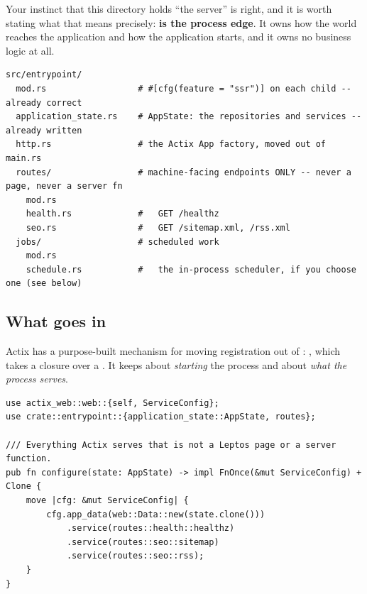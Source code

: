 Your instinct that this directory holds ``the server'' is right, and it is worth stating what that
means precisely: \textbf{ is the process edge}. It owns how the world reaches the
application and how the application starts, and it owns no business logic at all.

\begin{lstlisting}[style=tree,caption={\file{src/entrypoint/} filled in. Everything here is
\code{ssr}-only by nature, which \file{mod.rs} already declares correctly.}]
src/entrypoint/
  mod.rs                  # #[cfg(feature = "ssr")] on each child -- already correct
  application_state.rs    # AppState: the repositories and services -- already written
  http.rs                 # the Actix App factory, moved out of main.rs
  routes/                 # machine-facing endpoints ONLY -- never a page, never a server fn
    mod.rs
    health.rs             #   GET /healthz
    seo.rs                #   GET /sitemap.xml, /rss.xml
  jobs/                   # scheduled work
    mod.rs
    schedule.rs           #   the in-process scheduler, if you choose one (see below)
\end{lstlisting}

\subsection{What goes in }

Actix has a purpose-built mechanism for moving registration out of :
, which takes a closure over a . It keeps 
about \emph{starting} the process and  about \emph{what the process serves}.

\begin{lstlisting}[style=rs,caption={\file{src/entrypoint/http.rs}}]
use actix_web::web::{self, ServiceConfig};
use crate::entrypoint::{application_state::AppState, routes};

/// Everything Actix serves that is not a Leptos page or a server function.
pub fn configure(state: AppState) -> impl FnOnce(&mut ServiceConfig) + Clone {
    move |cfg: &mut ServiceConfig| {
        cfg.app_data(web::Data::new(state.clone()))
            .service(routes::health::healthz)
            .service(routes::seo::sitemap)
            .service(routes::seo::rss);
    }
}
\end{lstlisting}

